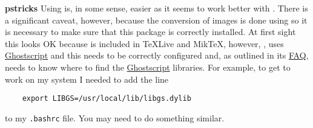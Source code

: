 \documentclass[svgnames]{article}
\begin{document}
\noindent\textbf{pstricks}
Using  is, in some sense, easier as it seems to work
better with . There is a significant caveat, however,
because the conversion of  images is done using
 so it is necessary to make sure that this package is
correctly installed. At first sight this looks OK because 
is included in \TeX Live and Mik\TeX, however, ,  uses
\href{https://www.ghostscript.com/}{Ghostscript} and this needs to be
correctly configured and, as outlined in its
\href{http://dvisvgm.bplaced.net/FAQ}{FAQ},  needs to know
where to find the \href{https://www.ghostscript.com/}{Ghostscript}
libraries. For example, to get  to work on my system I
needed to add the line
\begin{verbatim}
    export LIBGS=/usr/local/lib/libgs.dylib
\end{verbatim}
to my \verb|.bashrc| file. You may need to do something similar.
\end{document}
